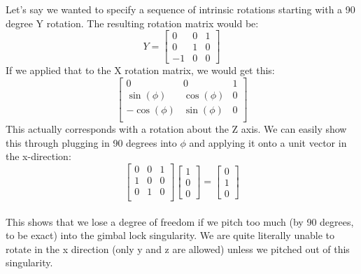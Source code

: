 \documentclass{article}
\begin{document}
\noindent Let's say we wanted to specify a sequence of intrinsic rotations starting with a 90 degree Y rotation. The
resulting rotation matrix would be:
\begin{equation*}
    Y = 
    \begin{bmatrix}
    0 & 0 & 1 \\
    0 & 1 & 0 \\
    -1 & 0 & 0
    \end{bmatrix}
\end{equation*}
If we applied that to the X rotation matrix, we would get this:
\begin{equation*}
    \begin{bmatrix}
        0 & 0 & 1 \\
        \sin(\phi) & \cos(\phi) & 0\\
        -\cos(\phi) & \sin(\phi) & 0 \\
    \end{bmatrix}
\end{equation*}
This actually corresponds with a rotation about the Z axis. We can easily show this through plugging in 90 degrees into
$\phi$ and applying it onto a unit vector in the x-direction:\\
\begin{equation*}
    \begin{bmatrix}
    0 & 0 & 1 \\
    1 & 0 & 0\\
    0 & 1 & 0 \\
    \end{bmatrix}
    \begin{bmatrix}
        1 \\ 0 \\ 0
    \end{bmatrix}
    =
    \begin{bmatrix}
        0 \\ 1 \\ 0
    \end{bmatrix}
\end{equation*}\\
This shows that we lose a degree of freedom if we pitch too much (by 90 degrees, to be exact) into the gimbal lock singularity.
We are quite literally unable to rotate in the x direction (only y and z are allowed) unless we pitched out of this singularity.
\end{document}
